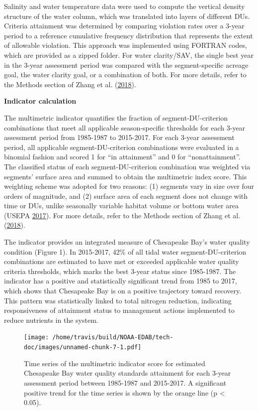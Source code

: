 \documentclass[
]{book}
\begin{document}
Salinity and water temperature data were used to compute the vertical density structure of the water column, which was translated into layers of different DUs. Criteria attainment was determined by comparing violation rates over a 3-year period to a reference cumulative frequency distribution that represents the extent of allowable violation. This approach was implemented using FORTRAN codes, which are provided as a zipped folder. For water clarity/SAV, the single best year in the 3-year assessment period was compared with the segment-specific acreage goal, the water clarity goal, or a combination of both. For more details, refer to the Methods section of Zhang et al. (\protect\hyperlink{ref-zhang2018}{2018}).

\textbf{Indicator calculation}

The multimetric indicator quantifies the fraction of segment-DU-criterion combinations that meet all applicable season-specific thresholds for each 3-year assessment period from 1985-1987 to 2015-2017. For each 3-year assessment period, all applicable segment-DU-criterion combinations were evaluated in a binomial fashion and scored 1 for ``in attainment'' and 0 for ``nonattainment''. The classified status of each segment-DU-criterion combination was weighted via segments' surface area and summed to obtain the multimetric index score. This weighting scheme was adopted for two reasons: (1) segments vary in size over four orders of magnitude, and (2) surface area of each segment does not change with time or DUs, unlike seasonally variable habitat volume or bottom water area (USEPA \protect\hyperlink{ref-usepa2017}{2017}). For more details, refer to the Methods section of Zhang et al. (\protect\hyperlink{ref-zhang2018}{2018}).

The indicator provides an integrated measure of Chesapeake Bay's water quality condition (Figure 1). In 2015-2017, 42\% of all tidal water segment-DU-criterion combinations are estimated to have met or exceeded applicable water quality criteria thresholds, which marks the best 3-year status since 1985-1987. The indicator has a positive and statistically significant trend from 1985 to 2017, which shows that Chesapeake Bay is on a positive trajectory toward recovery. This pattern was statistically linked to total nitrogen reduction, indicating responsiveness of attainment status to management actions implemented to reduce nutrients in the system.

\begin{figure}
\centering
\texttt{[image: /home/travis/build/NOAA-EDAB/tech-doc/images/unnamed-chunk-7-1.pdf]}
\caption{\label{fig:unnamed-chunk-7}Time series of the multimetric indicator score for estimated Chesapeake Bay water quality standards attainment for each 3-year assessment period between 1985-1987 and 2015-2017. A significant positive trend for the time series is shown by the orange line (p \textless{} 0.05).}
\end{figure}
\end{document}
